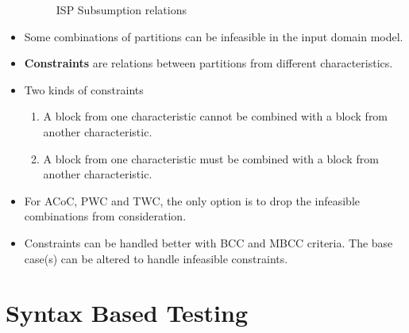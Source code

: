 \documentclass[a4paper]{article}
\begin{document}
\begin{itemize}
\begin{figure}[H]
        \caption{ISP Subsumption relations}
    \end{figure}
    \item Some combinations of partitions can be infeasible in the input domain model.
    \item \textbf{Constraints} are relations between partitions from different characteristics.
    \item Two kinds of constraints
    \begin{enumerate}
        \item A block from one characteristic cannot be combined with a block from another characteristic.
        \item A block from one characteristic must be combined with a block from another characteristic.
    \end{enumerate}
    \item For ACoC, PWC and TWC, the only option is to drop the infeasible combinations from consideration.
    \item Constraints can be handled better with BCC and MBCC criteria. The base case(s) can be altered to handle infeasible constraints.
\end{itemize}

\section{Syntax Based Testing}
\end{document}
